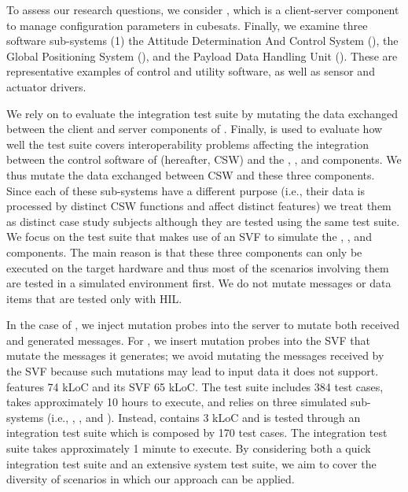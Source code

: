 To assess our research questions, we consider \PARAM, which is a client-server component to manage configuration parameters in cubesats. 
Finally, we examine three \ESAIL software sub-systems (1) the Attitude Determination And Control System (\ADCS), the Global Positioning System (\GPS), and the Payload Data Handling Unit (\PDHU). {These are representative examples of control and utility software, as well as sensor and actuator drivers.}

We rely on \APPR to evaluate the \PARAM integration test suite by  mutating the data exchanged between the client and server components of \PARAM.
Finally, \APPR is used to evaluate how well the
\ESAIL test suite covers interoperability problems affecting the integration between the control software of \ESAIL (hereafter, CSW) and the \ADCS, \PDHU, and \GPS components. We thus
mutate the data exchanged between \ESAIL CSW and these three components.
Since each of these sub-systems have a  different purpose (i.e., their data is processed by distinct CSW functions and affect distinct \ESAIL features) we treat them as distinct case study subjects although they are tested using the same test suite. We focus on the \ESAIL test suite that makes use of an SVF to simulate the \ADCS, \PDHU, and \GPS components.
The main reason is that these three components can only be executed on the target hardware and thus most of the scenarios involving them are tested in a simulated environment first.
We do not mutate messages or data items that are tested only with HIL.

In the case of \PARAM, we inject mutation probes into the \PARAM server to mutate both received and generated messages. For \ESAIL, we insert mutation probes into the SVF that mutate the messages it generates; we avoid mutating the messages received by the SVF because such mutations may lead to input data it does not support.
\ESAIL features 74 kLoC and its SVF 65 kLoC.
The \ESAIL test suite includes 384 test cases, takes approximately 10 hours to execute, and relies on three simulated
\SVF sub-systems (i.e., \ADCS, \GPS, and \PDHU).
Instead, \PARAM contains 3 kLoC and is tested through an integration test suite which is composed by 170 test cases.
The \PARAM integration test suite takes approximately 1 minute to execute.
By considering both a quick integration test suite and an extensive system test suite, we aim to cover the diversity of scenarios in which our approach can be applied.


